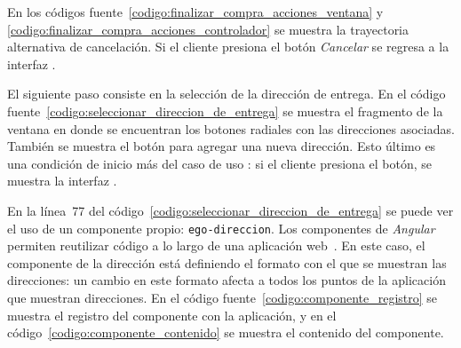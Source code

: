 

En los códigos fuente~\ref{codigo:finalizar_compra_acciones_ventana} y
\ref{codigo:finalizar_compra_acciones_controlador} se muestra la trayectoria
alternativa de cancelación. Si el cliente presiona el botón \textit{Cancelar}
se regresa a la interfaz .

El siguiente paso consiste en la selección de la dirección de entrega. En el
código fuente~\ref{codigo:seleccionar_direccion_de_entrega} se muestra el
fragmento de la ventana en donde se encuentran los botones radiales con las
direcciones asociadas. También se muestra el botón para agregar una nueva
dirección. Esto último es una condición de inicio más del caso de uso
: si el cliente presiona el
botón, se muestra la interfaz
.


En la línea~77 del código~\ref{codigo:seleccionar_direccion_de_entrega} se
puede ver el uso de un componente propio: \texttt{ego-direccion}. Los
componentes de \textit{Angular} permiten reutilizar código a lo largo de una
aplicación web~\cite{angular_componentes}. En este caso, el componente de la
dirección está definiendo el formato con el que se muestran las direcciones: un
cambio en este formato afecta a todos los puntos de la aplicación que muestran
direcciones. En el código fuente~\ref{codigo:componente_registro} se muestra el
registro del componente con la aplicación, y en el
código~\ref{codigo:componente_contenido} se muestra el contenido del componente.



